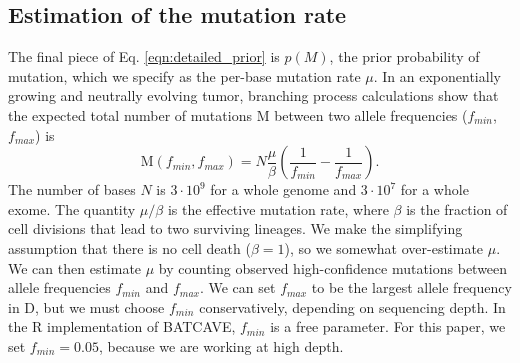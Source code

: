 \documentclass[a4,center,fleqn]{NAR}
\newcommand{\batcave}{BATCAVE\xspace}
\begin{document}
\subsection{Estimation of the mutation rate}
The final piece of Eq. \ref{eqn:detailed_prior} is $p(M)$, the prior probability of mutation, which we specify as the per-base mutation rate $\mu$.
In an exponentially growing and neutrally evolving tumor, branching process calculations \cite{Williams2018} show that the expected total number of mutations $\mathrm{M}$ between two allele frequencies ($f_{min}$,$f_{max}$) is
\begin{equation}
  \label{eqn:mut_rate}
  \mathrm{M}(f_{min},f_{max}) = N\frac{\mu}{\beta}\left(\frac{1}{f_{min}} - \frac{1}{f_{max}}\right).
\end{equation}
The number of bases $N$ is $3\cdot10^9$ for a whole genome and $3\cdot10^7$ for a whole exome.
The quantity $\mu/\beta$ is the effective mutation rate, where $\beta$ is the fraction of cell divisions that lead to two surviving lineages.
We make the simplifying assumption that there is no cell death ($\beta = 1$), so we somewhat over-estimate $\mu$.
We can then estimate $\mu$ by counting observed high-confidence mutations between allele frequencies $f_{min}$ and $f_{max}$.
We can set $f_{max}$ to be the largest allele frequency in $\mathrm{D}$, but we must choose $f_{min}$ conservatively, depending on sequencing depth.
In the R implementation of \batcave, $f_{min}$ is a free parameter.
For this paper, we set $f_{min} = 0.05$, because we are working at high depth.
\end{document}
